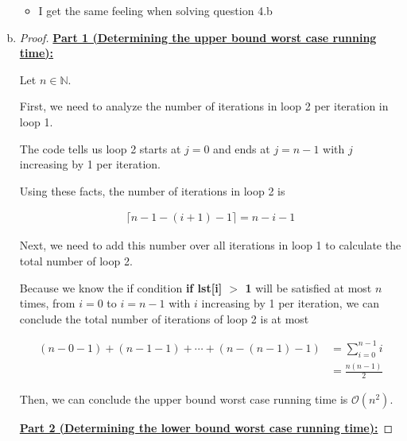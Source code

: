 \documentclass[12pt]{article}
\begin{document}
\begin{enumerate}[a.]
\begin{itemize}
        \item I get the same feeling when solving question 4.b
    \end{itemize}

    \item

    \begin{proof}
        \underline{\textbf{Part 1 (Determining the upper bound worst case running time):}}

        \bigskip

        Let $n \in \mathbb{N}$.

        \bigskip

        First, we need to analyze the number of iterations in loop 2 per iteration in
        loop 1.

        \bigskip

        The code tells us loop 2 starts at $j = 0$ and ends at $j = n -1$ with $j$
        increasing by 1 per iteration.

        \bigskip

        Using these facts, the number of iterations in loop 2 is

        \setcounter{equation}{0}
        \begin{align}
            \lceil n - 1 - (i+1) - 1 \rceil = n - i - 1
        \end{align}

        \bigskip

        Next, we need to add this number over all iterations in loop 1 to calculate
        the total number of loop 2.

        \bigskip

        Because we know the if condition \textbf{if lst[i] $>$ 1} will be satisfied at most
        $n$ times, from $i = 0$ to $i = n - 1$ with $i$ increasing by 1 per iteration,
        we can conclude the total number of iterations of loop 2 is at most

        \begin{align}
            (n-0-1) + (n-1-1) + \cdots + (n - (n-1) - 1) &= \sum\limits_{i=0}^{n-1} i\\
            &= \frac{n(n-1)}{2}
        \end{align}

        \bigskip

        Then, we can conclude the upper bound worst case running time is $\mathcal{O}(n^2)$.

        \bigskip

        \underline{\textbf{Part 2 (Determining the lower bound worst case running time):}}


\end{proof}
\end{enumerate}
\end{document}
